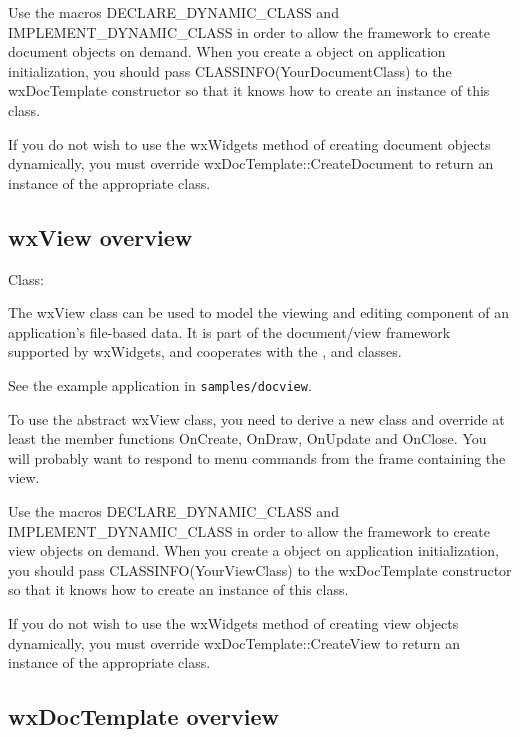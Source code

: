 Use the macros DECLARE\_DYNAMIC\_CLASS and IMPLEMENT\_DYNAMIC\_CLASS in order
to allow the framework to create document objects on demand. When you create
a  object on application initialization, you
should pass CLASSINFO(YourDocumentClass) to the wxDocTemplate constructor
so that it knows how to create an instance of this class.

If you do not wish to use the wxWidgets method of creating document
objects dynamically, you must override wxDocTemplate::CreateDocument
to return an instance of the appropriate class.

\subsection{wxView overview}\label{wxviewoverview}


Class: 

The wxView class can be used to model the viewing and editing component of
an application's file-based data. It is part of the document/view framework supported by wxWidgets,
and cooperates with the , 
and  classes.

See the example application in {\tt samples/docview}.

To use the abstract wxView class, you need to derive a new class and override
at least the member functions OnCreate, OnDraw, OnUpdate and OnClose. You will probably
want to respond to menu commands from the frame containing the view.

Use the macros DECLARE\_DYNAMIC\_CLASS and IMPLEMENT\_DYNAMIC\_CLASS in order
to allow the framework to create view objects on demand. When you create
a  object on application initialization, you
should pass CLASSINFO(YourViewClass) to the wxDocTemplate constructor
so that it knows how to create an instance of this class.

If you do not wish to use the wxWidgets method of creating view
objects dynamically, you must override wxDocTemplate::CreateView
to return an instance of the appropriate class.

\subsection{wxDocTemplate overview}\label{wxdoctemplateoverview}

